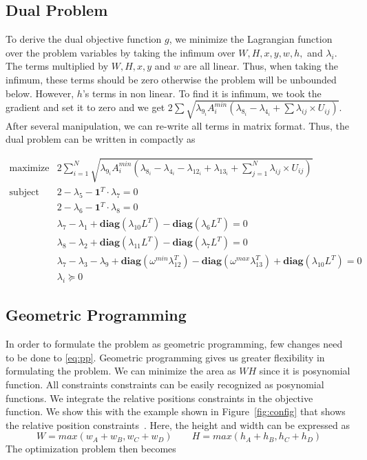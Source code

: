 \documentclass[12pt] {article}
\begin{document}
\subsection*{Dual Problem}
To derive the dual objective function $g$, we minimize the Lagrangian function over the problem variables by taking the infimum over $W,H,x,y,w,h,$ and $\lambda_{i}$. The terms multiplied by $W, H, x, y$ and $w$ are all linear. Thus, when taking the infimum, these terms should be zero otherwise the problem will be unbounded below. However, $h$'s terms in non linear. To find it is infimum, we took the gradient and set it to zero and we get $
2\sum \sqrt{\lambda_{9_{i}}A_{i}^{min}\left(\lambda_{8_{i}} -\lambda_{4_{i}} + \sum \lambda_{ij}\times U_{ij} \right)}
$.
After several manipulation, we can re-write all terms in matrix format. Thus, the dual problem can be written in compactly as 
\begin{small}
\[
\begin{array}{cl}
\text{maximize}   & 2\sum_{i=1}^{N} \sqrt{\lambda_{9_{i}}A_{i}^{min}\left(\lambda_{8_{i}} -\lambda_{4_{i}} - \lambda_{12_{i}} +\lambda_{13_{i}}  + \sum_{j=1}^{N} \lambda_{ij}\times U_{ij} \right)} \\
\text{subject to} & 2-\lambda_{5}- \textbf{1}^{T}\cdot \lambda_{7} = 0\\
& 2-\lambda_{6}- \textbf{1}^{T}\cdot\lambda_{8} = 0\\
& \lambda_{7} -\lambda_{1} +  \textbf{diag}(\lambda_{10}L^{T})-\textbf{diag}(\lambda_{6}L^{T})  = 0\\
& \lambda_{8} -\lambda_{2} +  \textbf{diag}(\lambda_{11}L^{T})-\textbf{diag}(\lambda_{7}L^{T})  = 0\\
& \lambda_{7} -\lambda_{3} -\lambda_{9} +  \textbf{diag}(\omega^{min}\lambda_{12}^{T}) -  \textbf{diag}(\omega^{max}\lambda_{13}^{T})+  \textbf{diag}(\lambda_{10}L^{T}) = 0\\
& \lambda_{i} \succeq 0
\end{array} 
\]
\end{small}

\subsection*{Geometric Programming} 
In order to formulate the problem as geometric programming, few changes need to be done to \ref{eq:pp}. Geometric programming gives us greater flexibility in formulating the problem. We can minimize the area as $WH$ since it is posynomial function. All constraints constraints can be easily recognized as posynomial functions. We integrate the relative positions constraints in the objective function. We show this with the example shown in Figure~\ref{fig:config} that shows the relative position constraints~\citep{boyd2007tutorial}. Here, the height and width can be expressed as 
$$
W = max(w_{A}+w_{B}, w_{C}+w_{D}) \qquad  H = max(h_{A}+h_{B}, h_{C}+h_{D})
$$
The optimization problem then becomes 
\end{document}
